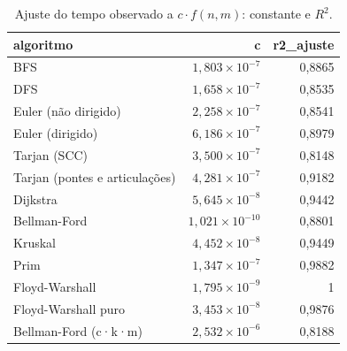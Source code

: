 \begin{table}[htbp]
\centering
\small
\caption{Ajuste do tempo observado a $c \cdot f(n,m)$: constante e $R^2$.}
\label{tab:04_ajuste_complexidade}
\begin{tabular}{lrr}
\toprule
algoritmo & c & r2\_ajuste \\
\midrule
BFS & $1,803 \times 10^{-7}$ & 0,8865 \\
DFS & $1,658 \times 10^{-7}$ & 0,8535 \\
Euler (não dirigido) & $2,258 \times 10^{-7}$ & 0,8541 \\
Euler (dirigido) & $6,186 \times 10^{-7}$ & 0,8979 \\
Tarjan (SCC) & $3,500 \times 10^{-7}$ & 0,8148 \\
Tarjan (pontes e articulações) & $4,281 \times 10^{-7}$ & 0,9182 \\
Dijkstra & $5,645 \times 10^{-8}$ & 0,9442 \\
Bellman-Ford & $1,021 \times 10^{-10}$ & 0,8801 \\
Kruskal & $4,452 \times 10^{-8}$ & 0,9449 \\
Prim & $1,347 \times 10^{-7}$ & 0,9882 \\
Floyd-Warshall & $1,795 \times 10^{-9}$ & 1 \\
Floyd-Warshall puro & $3,453 \times 10^{-8}$ & 0,9876 \\
Bellman-Ford (c·k·m) & $2,532 \times 10^{-6}$ & 0,8188 \\
\bottomrule
\end{tabular}
\end{table}
